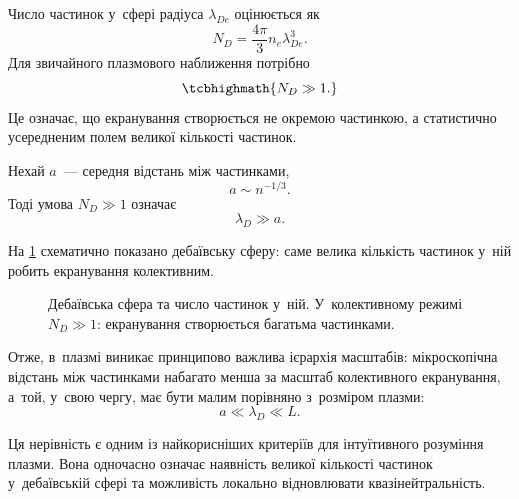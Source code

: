 Число частинок у~сфері радіуса $\lambda_{De}$ оцінюється як
\begin{equation}
	N_D=\frac{4\pi}{3}n_e\lambda_{De}^3.
\end{equation}
Для звичайного плазмового наближення потрібно
\begin{equation}
	\tcbhighmath{N_D\gg1.}
\end{equation}
Це означає, що екранування створюється не окремою частинкою, а статистично усередненим полем великої кількості частинок.

Нехай $a$~--- середня відстань між частинками,
\begin{equation}
	a\sim n^{-1/3}.
\end{equation}
Тоді умова $N_D\gg1$ означає
\begin{equation*}
	\lambda_D\gg a.
\end{equation*}

На \ref{fig:debye-sphere} схематично показано дебаївську сферу: саме велика кількість частинок у~ній робить екранування колективним.

\begin{figure}\centering
	\caption{Дебаївська сфера та число частинок у~ній. У~колективному режимі $N_D\gg1$: екранування створюється багатьма частинками.}\label{fig:debye-sphere}
\end{figure}

Отже, в~плазмі виникає принципово важлива ієрархія масштабів: мікроскопічна відстань між частинками набагато менша за масштаб колективного екранування, а~той, у~свою чергу, має бути малим порівняно з~розміром плазми:
\begin{equation}
	a\ll\lambda_D\ll L.
\end{equation}

Ця нерівність є одним із найкорисніших критеріїв для інтуїтивного розуміння плазми. Вона одночасно означає наявність великої кількості частинок у~дебаївській сфері та можливість локально відновлювати квазінейтральність.

